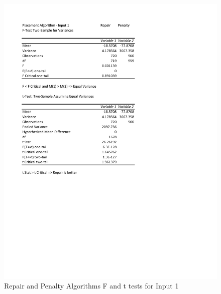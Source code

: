 \documentclass[times]{article}
\begin{document}
	\begin{figure}
		\caption{Repair and Penalty Algorithms F and t tests for Input 1}
		\label{fig:repair_penalty1}
		\includegraphics[width=\textwidth]{./t_test/Repair_Penalty1}
	\end{figure}
\end{document}
